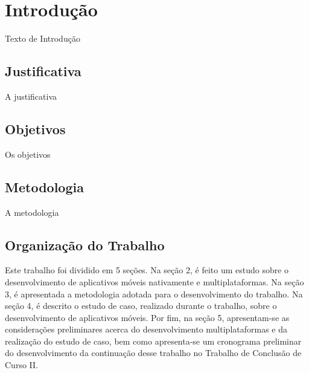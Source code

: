 \chapter{Introdução} \label{cap:introducao}

Texto de Introdução

\section{Justificativa}

A justificativa

\section{Objetivos} \label{sec:objetivos}

Os objetivos

\section{Metodologia}

A metodologia

\section{Organização do Trabalho}

Este trabalho foi dividido em 5 seções. Na seção 2, é feito um estudo sobre o desenvolvimento de aplicativos móveis nativamente e multiplataformas. 
Na seção 3, é apresentada a metodologia adotada para o desenvolvimento do trabalho. Na seção 4, é descrito o estudo de caso, realizado durante o trabalho, sobre o desenvolvimento de aplicativos móveis.
Por fim, na seção 5, apresentam-se as considerações preliminares acerca do desenvolvimento multiplataformas e da realização do estudo de caso, bem como apresenta-se um cronograma preliminar do desenvolvimento 
da continuação desse trabalho no Trabalho de Conclusão de Curso II. 